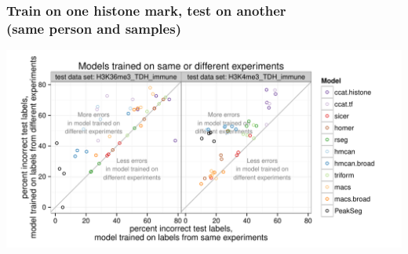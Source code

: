 \documentclass{beamer}
\begin{document}
\begin{frame}
  \frametitle{Train on one histone mark, test on another\\
(same person and samples)}
  \includegraphics[width=1.1\textwidth]{figure-test-TDH-experiments.pdf}
\end{frame}
\end{document}
